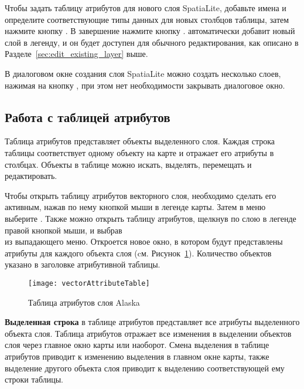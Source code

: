 Чтобы задать таблицу атрибутов для нового слоя SpatiaLite, добавьте имена
и определите соответствующие типы данных для новых столбцов таблицы, затем
нажмите кнопку . В завершение нажмите кнопку .
\qg автоматически добавит новый слой в легенду, и он будет доступен для
обычного редактирования, как описано в Разделе~\ref{sec:edit_existing_layer} выше.

В диалоговом окне создания слоя SpatiaLite можно создать несколько слоев,
нажимая на кнопку , при этом нет необходимости закрывать
диалоговое окно.

\subsection{Работа с таблицей атрибутов}
\label{sec:attribute table}

Таблица атрибутов представляет объекты выделенного слоя. Каждая строка таблицы
соответствует одному объекту на карте и отражает его атрибуты в столбцах.
Объекты в таблице можно искать, выделять, перемещать и редактировать.

Чтобы открыть таблицу атрибутов векторного слоя, необходимо сделать его активным,
нажав по нему кнопкой мыши в легенде карты. Затем в меню 
выберите .
Также можно открыть таблицу атрибутов, щелкнув по слою в легенде правой
кнопкой мыши, и выбрав \\
из выпадающего меню. Откроется новое окно, в котором будут представлены атрибуты
для каждого объекта слоя (cм. Рисунок~\ref{fig:attributetable}). Количество
объектов указано в заголовке атрибутивной таблицы.

\begin{figure}[ht]
   \centering
   \texttt{[image: vectorAttributeTable]}
   \caption{Таблица атрибутов слоя Alaska \wincaption}\label{fig:attributetable}
\end{figure}


\textbf{Выделенная строка} в таблице атрибутов представляет все атрибуты
выделенного объекта слоя. Таблица атрибутов отражает все изменения в
выделении объектов слоя через главное окно карты или наоборот. Смена
выделения в таблице атрибутов приводит к изменению выделения в главном
окне карты, также выделение другого объекта слоя приводит к выделению
соответствующей ему строки таблицы.

